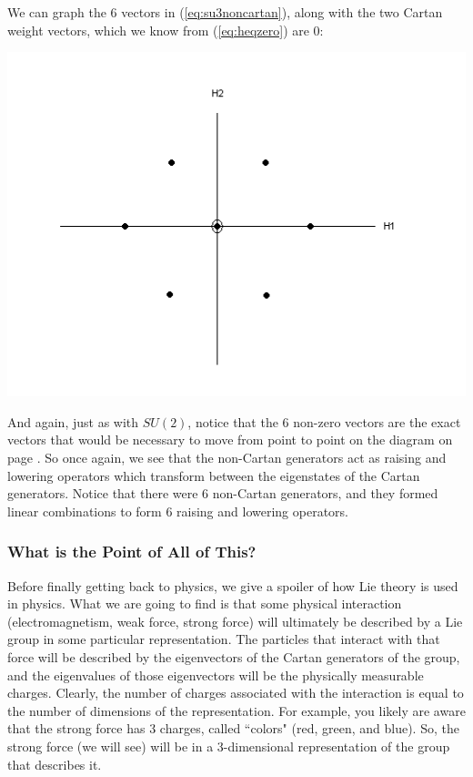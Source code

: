 \documentclass[12pt,epsf]{article}
\begin{document}
We can graph the 6 vectors in (\ref{eq:su3noncartan}), along with the
two Cartan weight vectors, which we know from (\ref{eq:heqzero}) are 0:
\begin{center}
\includegraphics[scale = .7]{su3adjoint.PNG}
\end{center}

And again, just as with $SU(2)$, notice that the 6 non-zero vectors
are the exact vectors that would be necessary to move from point to
point on the diagram on page \pageref{su3fundy}.  So once again, we see
that the non-Cartan generators act as raising and lowering operators
which transform between the eigenstates of the Cartan generators. 
Notice that there were 6 non-Cartan generators, and they formed
linear combinations to form 6 raising and lowering operators.  

\subsubsection{What is the Point of All of This?}
\label{sec:whatpoint}

Before finally getting back to physics, we give a spoiler of how Lie
theory is used in physics.  What we are going to find is that some
physical interaction (electromagnetism, weak force, strong force) will
ultimately be described by a Lie group in some particular
representation.  The particles that interact with that force will be
described by the eigenvectors of the Cartan generators of the group,
and the eigenvalues of those eigenvectors will be the physically
measurable charges.  Clearly, the number of charges associated with the
interaction is equal to the number of dimensions of the representation.
For example, you likely are aware that the strong force has 3
charges, called ``colors" (red, green, and blue).  So, the strong force
(we will see) will be in a 3-dimensional representation of the group
that describes it.  
\end{document}
